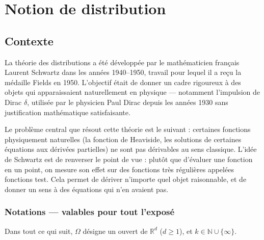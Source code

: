 \documentclass[12pt,a4paper,openany]{book}
\theoremstyle{definition}
\theoremstyle{plain}
\theoremstyle{remark}
\begin{document}
	\mainmatter
	
	
	
	
	
	\chapter{Notion de distribution}
	
	\section*{Contexte}
	
	La théorie des distributions a été développée par le mathématicien français Laurent Schwartz dans les années 1940–1950, travail pour lequel il a reçu la médaille Fields en 1950. L'objectif était de donner un cadre rigoureux à des objets qui apparaissaient naturellement en physique — notamment l'impulsion de Dirac $\delta$, utilisée par le physicien Paul Dirac depuis les années 1930 sans justification mathématique satisfaisante.
	
	Le problème central que résout cette théorie est le suivant : certaines fonctions physiquement naturelles (la fonction de Heaviside, les solutions de certaines équations aux dérivées partielles) ne sont pas dérivables au sens classique. L'idée de Schwartz est de renverser le point de vue : plutôt que d'évaluer une fonction en un point, on mesure son effet sur des fonctions très régulières appelées fonctions test. Cela permet de dériver n'importe quel objet raisonnable, et de donner un sens à des équations qui n'en avaient pas.
	
	\subsection*{Notations — valables pour tout l'exposé}
	
	Dans tout ce qui suit, $\Omega$ désigne un ouvert de $\mathbb{R}^d$ ($d \ge 1$), et $k \in \mathbb{N} \cup \{\infty\}$.
	
\end{document}
